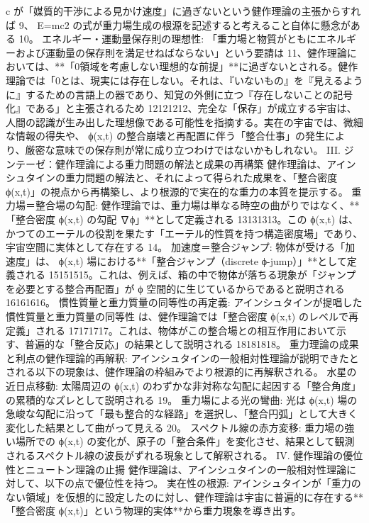 \documentclass{article}
\begin{document}
c が「媒質的干渉による見かけ速度」に過ぎないという健作理論の主張からすれば 9、
E=mc2 の式が重力場生成の根源を記述すると考えること自体に懸念がある 10。
エネルギー・運動量保存則の理想性: 「重力場と物質がともにエネルギーおよび運動量の保存則を満足せねばならない」という要請は 11、健作理論においては、**「0領域を考慮しない理想的な前提」**に過ぎないとされる。健作理論では「0とは、現実には存在しない。それは、『いないもの』を『見えるように』するための言語上の器であり、知覚の外側に立つ『存在しないことの記号化』である」と主張されるため 12121212、完全な「保存」が成立する宇宙は、人間の認識が生み出した理想像である可能性を指摘する。実在の宇宙では、微細な情報の得失や、
ϕ(x,t) の整合崩壊と再配置に伴う「整合仕事」の発生により、厳密な意味での保存則が常に成り立つわけではないかもしれない。
III. ジンテーゼ：健作理論による重力問題の解法と成果の再構築
健作理論は、アインシュタインの重力問題の解法と、それによって得られた成果を、「整合密度 ϕ(x,t)」の視点から再構築し、より根源的で実在的な重力の本質を提示する。
重力場＝整合場の勾配:
健作理論では、重力場は単なる時空の曲がりではなく、**「整合密度 
ϕ(x,t) の勾配 ∇ϕ」**として定義される 13131313。この 
ϕ(x,t) は、かつてのエーテルの役割を果たす「エーテル的性質を持つ構造密度場」であり、宇宙空間に実体として存在する 14。
加速度＝整合ジャンプ:
物体が受ける「加速度」は、
ϕ(x,t) 場における**「整合ジャンプ（discrete ϕ-jump）」**として定義される 15151515。これは、例えば、箱の中で物体が落ちる現象が「ジャンプを必要とする整合再配置」が 
ϕ 空間的に生じているからであると説明される 16161616。
慣性質量と重力質量の同等性の再定義:
アインシュタインが提唱した慣性質量と重力質量の同等性 は、健作理論では「整合密度 
ϕ(x,t) のレベルで再定義」される 17171717。これは、物体がこの整合場との相互作用において示す、普遍的な「整合反応」の結果として説明される 18181818。
重力理論の成果と利点の健作理論的再解釈:
アインシュタインの一般相対性理論が説明できたとされる以下の現象は、健作理論の枠組みでより根源的に再解釈される。
水星の近日点移動: 太陽周辺の ϕ(x,t) のわずかな非対称な勾配に起因する「整合角度」の累積的なズレとして説明される 19。
重力場による光の彎曲: 光は ϕ(x,t) 場の急峻な勾配に沿って「最も整合的な経路」を選択し、「整合円弧」として大きく変化した結果として曲がって見える 20。
スペクトル線の赤方変移: 重力場の強い場所での ϕ(x,t) の変化が、原子の「整合条件」を変化させ、結果として観測されるスペクトル線の波長がずれる現象として解釈される。
IV. 健作理論の優位性とニュートン理論の止揚
健作理論は、アインシュタインの一般相対性理論に対して、以下の点で優位性を持つ。
実在性の根源: アインシュタインが「重力のない領域」を仮想的に設定したのに対し、健作理論は宇宙に普遍的に存在する**「整合密度 ϕ(x,t)」という物理的実体**から重力現象を導き出す。
\end{document}
